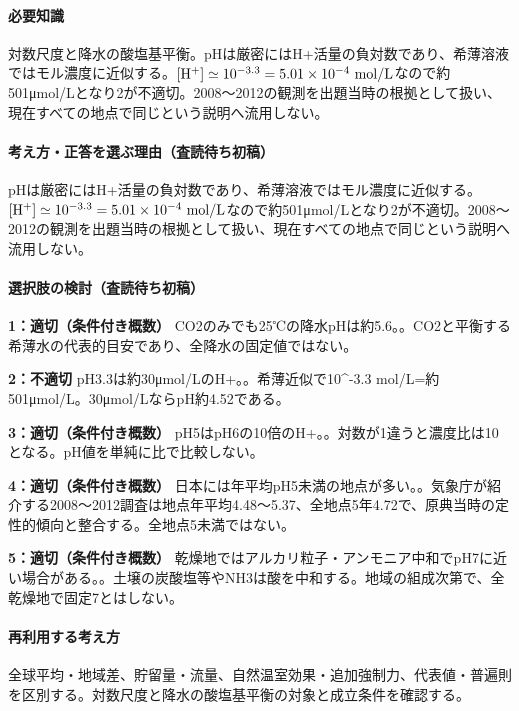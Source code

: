\paragraph{必要知識} 対数尺度と降水の酸塩基平衡。pHは厳密にはH+活量の負対数であり、希薄溶液ではモル濃度に近似する。\([{\rm H}^+]\simeq10^{-3.3}=5.01\times10^{-4}\ {\rm mol/L}\)なので約501μmol/Lとなり2が不適切。2008〜2012の観測を出題当時の根拠として扱い、現在すべての地点で同じという説明へ流用しない。

\paragraph{考え方・正答を選ぶ理由（査読待ち初稿）} pHは厳密にはH+活量の負対数であり、希薄溶液ではモル濃度に近似する。\([{\rm H}^+]\simeq10^{-3.3}=5.01\times10^{-4}\ {\rm mol/L}\)なので約501μmol/Lとなり2が不適切。2008〜2012の観測を出題当時の根拠として扱い、現在すべての地点で同じという説明へ流用しない。

\paragraph{選択肢の検討（査読待ち初稿）}\mbox{}\par

\noindent\textbf{1：適切（条件付き概数）} CO2のみでも25℃の降水pHは約5.6。。CO2と平衡する希薄水の代表的目安であり、全降水の固定値ではない。\par

\noindent\textbf{2：不適切} pH3.3は約30μmol/LのH+。。希薄近似で10\textasciicircum{}-3.3 mol/L=約501μmol/L。30μmol/LならpH約4.52である。\par

\noindent\textbf{3：適切（条件付き概数）} pH5はpH6の10倍のH+。。対数が1違うと濃度比は10となる。pH値を単純に比で比較しない。\par

\noindent\textbf{4：適切（条件付き概数）} 日本には年平均pH5未満の地点が多い。。気象庁が紹介する2008〜2012調査は地点年平均4.48〜5.37、全地点5年4.72で、原典当時の定性的傾向と整合する。全地点5未満ではない。\par

\noindent\textbf{5：適切（条件付き概数）} 乾燥地ではアルカリ粒子・アンモニア中和でpH7に近い場合がある。。土壌の炭酸塩等やNH3は酸を中和する。地域の組成次第で、全乾燥地で固定7とはしない。\par

\paragraph{再利用する考え方} 全球平均・地域差、貯留量・流量、自然温室効果・追加強制力、代表値・普遍則を区別する。対数尺度と降水の酸塩基平衡の対象と成立条件を確認する。

